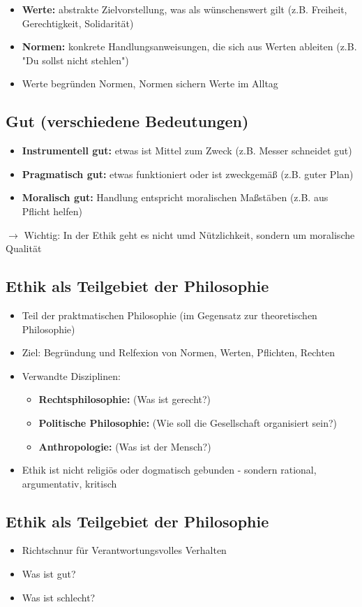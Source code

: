 \begin{itemize}
    \item \textbf{Werte:} abstrakte Zielvorstellung, was als wünschenswert gilt (z.B. Freiheit, Gerechtigkeit, Solidarität)
    \item \textbf{Normen:} konkrete Handlungsanweisungen, die sich aus Werten ableiten (z.B. "Du sollst nicht stehlen")
    \item Werte begründen Normen, Normen sichern Werte im Alltag
\end{itemize}

\subsection{Gut (verschiedene Bedeutungen)}

\begin{itemize}
    \item \textbf{Instrumentell gut:} etwas ist Mittel zum Zweck (z.B. Messer schneidet gut)
    \item \textbf{Pragmatisch gut:} etwas funktioniert oder ist zweckgemäß (z.B. guter Plan)
    \item \textbf{Moralisch gut:} Handlung entspricht moralischen Maßstäben (z.B. aus Pflicht helfen)
\end{itemize}

$\rightarrow$ Wichtig: In der Ethik geht es nicht umd Nützlichkeit, sondern um moralische Qualität

\subsection{Ethik als Teilgebiet der Philosophie}
\begin{itemize}
    \item Teil der praktmatischen Philosophie (im Gegensatz zur theoretischen Philosophie)
    \item Ziel: Begründung und Relfexion von Normen, Werten, Pflichten, Rechten
    \item Verwandte Disziplinen:
    \begin{itemize}
        \item \textbf{Rechtsphilosophie:} (Was ist gerecht?)
        \item \textbf{Politische Philosophie:} (Wie soll die Gesellschaft organisiert sein?)
        \item \textbf{Anthropologie:} (Was ist der Mensch?)
    \end{itemize}
    \item Ethik ist nicht religiös oder dogmatisch gebunden - sondern rational, argumentativ, kritisch
\end{itemize}


\subsection{Ethik als Teilgebiet der Philosophie}
\begin{itemize}
    \item Richtschnur für Verantwortungsvolles Verhalten
    \item Was ist gut?
    \item Was ist schlecht?
\end{itemize}

